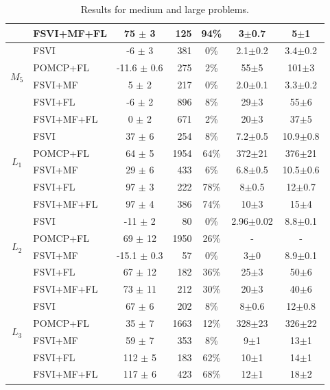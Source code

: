\documentclass[letterpaper]{article} %
\newcommand{\itay}[1]{}
\begin{document}
\begin{table}
{\begin{tabular}{ |c|l|c|r|c|c|c| }
    & FSVI+MF+FL\itay{+} & 75 $\pm$ 3 & 125 & 94\% & 3$\pm$0.7 & 5$\pm$1 \\
    \hline\hline
    \multirow{4}{*}{$M_5$}
    & FSVI\itay{+} & -6 $\pm$ 3 & 381 & 0\% & 2.1$\pm$0.2 & 3.4$\pm$0.2 \\
    & POMCP+FL\itay{+} & -11.6 $\pm$ 0.6 & 275 & 2\% & 55$\pm$5 & 101$\pm$3 \\
    & FSVI+MF\itay{+} & 5 $\pm$ 2 & 217 & 0\% & 2.0$\pm$0.1 & 3.3$\pm$0.2 \\
    &FSVI+FL\itay{+} & -6 $\pm$ 2 & 896 & 8\% & 29$\pm$3 & 55$\pm$6 \\
    & FSVI+MF+FL\itay{+} & 0 $\pm$ 2 & 671 & 2\% & 20$\pm$3 & 37$\pm$5 \\
    \hline\hline
    \multirow{4}{*}{$L_1$}
    & FSVI\itay{+} & 37 $\pm$ 6 & 254 & 8\% &  7.2$\pm$0.5 & 10.9$\pm$0.8 \\
    & POMCP+FL\itay{+} & 64 $\pm$ 5 & 1954 & 64\% &  372$\pm$21 & 376$\pm$21 \\
    & FSVI+MF\itay{+} & 29 $\pm$ 6 & 433 & 6\% &  6.8$\pm$0.5 & 10.5$\pm$0.6 \\
    &FSVI+FL\itay{+} & 97 $\pm$ 3 & 222 & 78\% &  8$\pm$0.5 & 12$\pm$0.7 \\
    & FSVI+MF+FL\itay{+} & 97 $\pm$ 4 & 386 & 74\% &  10$\pm$3 & 15$\pm$4 \\
    \hline\hline
    \multirow{4}{*}{$L_2$}
    & FSVI\itay{+} & -11 $\pm$ 2 & 80 & 0\% &  2.96$\pm$0.02 & 8.8$\pm$0.1 \\
    & POMCP+FL\itay{-} & 69 $\pm$ 12 & 1950 & 26\% &  - & - \\
    & FSVI+MF\itay{+} & -15.1 $\pm$ 0.3 & 57 & 0\% &  3$\pm$0 & 8.9$\pm$0.1 \\
    &FSVI+FL\itay{+} & 67 $\pm$ 12 & 182 & 36\% &  25$\pm$3 & 50$\pm$6 \\
    & FSVI+MF+FL\itay{+} & 73 $\pm$ 11 & 212 & 30\% & 20$\pm$3 & 40$\pm$6 \\
    \hline \hline
    \multirow{4}{*}{$L_3$}
    & FSVI\itay{+} & 67 $\pm$ 6 & 202 & 8\% & 8$\pm$0.6 & 12$\pm$0.8 \\
    & POMCP+FL\itay{+} & 35 $\pm$ 7 & 1663 & 12\% & 328$\pm$23 & 326$\pm$22 \\
    & FSVI+MF\itay{+} & 59 $\pm$ 7 & 353 & 8\% & 9$\pm$1 & 13$\pm$1 \\
    &FSVI+FL\itay{+} & 112 $\pm$ 5 & 183 & 62\% & 10$\pm$1 & 14$\pm$1 \\
    & FSVI+MF+FL\itay{+} & 117 $\pm$ 6 & 423 & 68\% & 12$\pm$1 & 18$\pm$2 \\
    \hline
    \end{tabular}
    }
    \caption{Results for medium and large problems.}%
    \label{tab:large-results}
\end{table}
\end{document}
